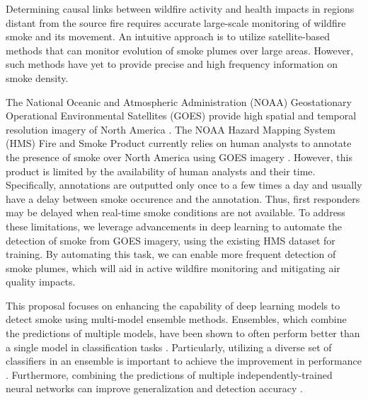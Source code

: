 \documentclass{article}
\begin{document}
Determining causal links between wildfire activity and health impacts in regions distant from the source fire requires accurate large-scale monitoring of wildfire smoke and its movement. An intuitive approach is to utilize satellite-based methods that can monitor evolution of smoke plumes over large areas. However, such methods have yet to provide precise and high frequency information on smoke density. 

The National Oceanic and Atmospheric Administration (NOAA) Geostationary Operational Environmental Satellites (GOES) provide high spatial and temporal resolution imagery of North America \citep{GOESbook}. The NOAA Hazard Mapping System (HMS) Fire and Smoke Product currently relies on human analysts to annotate the presence of smoke over North America using GOES imagery \citep{hms}. However, this product is limited by the availability of human analysts and their time. Specifically, annotations are outputted only once to a few times a day and usually have a delay between smoke occurence and the annotation. Thus, first responders may be delayed when real-time smoke conditions are not available. To address these limitations, we leverage advancements in deep learning to automate the detection of smoke from GOES imagery, using the existing HMS dataset for training. By automating this task, we can enable more frequent detection of smoke plumes, which will aid in active wildfire monitoring and mitigating air quality impacts.

This proposal focuses on enhancing the capability of deep learning models to detect smoke using multi-model ensemble methods. Ensembles, which combine the predictions of multiple models, have been shown to often perform better than a single model in classification tasks \citep{ensemble-ml}. Particularly, utilizing a diverse set of classifiers in an ensemble is important to achieve the improvement in performance \citep{ensemble-diversity}. Furthermore, combining the predictions of multiple independently-trained neural networks can improve generalization and detection accuracy \citep{nn-ensemble,nn-ensemble2, nn-error-ens}. 
\end{document}
